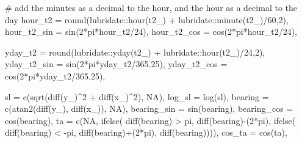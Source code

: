 \documentclass[
  letterpaper,
  DIV=11,
  numbers=noendperiod]{scrartcl}
\newenvironment{Shaded}{\begin{snugshade}}{\end{snugshade}}
\newcommand{\AttributeTok}[1]{\textcolor[rgb]{0.40,0.45,0.13}{#1}}
\newcommand{\CommentTok}[1]{\textcolor[rgb]{0.37,0.37,0.37}{#1}}
\newcommand{\ConstantTok}[1]{\textcolor[rgb]{0.56,0.35,0.01}{#1}}
\newcommand{\DecValTok}[1]{\textcolor[rgb]{0.68,0.00,0.00}{#1}}
\newcommand{\FloatTok}[1]{\textcolor[rgb]{0.68,0.00,0.00}{#1}}
\newcommand{\FunctionTok}[1]{\textcolor[rgb]{0.28,0.35,0.67}{#1}}
\newcommand{\NormalTok}[1]{\textcolor[rgb]{0.00,0.23,0.31}{#1}}
\newcommand{\SpecialCharTok}[1]{\textcolor[rgb]{0.37,0.37,0.37}{#1}}
\begin{document}
\begin{Shaded}
\begin{Highlighting}[]
    \CommentTok{\# add the minutes as a decimal to the hour, and the hour as a decimal to the day}
    \AttributeTok{hour\_t2 =} \FunctionTok{round}\NormalTok{(lubridate}\SpecialCharTok{::}\FunctionTok{hour}\NormalTok{(t2\_) }\SpecialCharTok{+}\NormalTok{ lubridate}\SpecialCharTok{::}\FunctionTok{minute}\NormalTok{(t2\_)}\SpecialCharTok{/}\DecValTok{60}\NormalTok{,}\DecValTok{2}\NormalTok{),}
    \AttributeTok{hour\_t2\_sin =} \FunctionTok{sin}\NormalTok{(}\DecValTok{2}\SpecialCharTok{*}\NormalTok{pi}\SpecialCharTok{*}\NormalTok{hour\_t2}\SpecialCharTok{/}\DecValTok{24}\NormalTok{),}
    \AttributeTok{hour\_t2\_cos =} \FunctionTok{cos}\NormalTok{(}\DecValTok{2}\SpecialCharTok{*}\NormalTok{pi}\SpecialCharTok{*}\NormalTok{hour\_t2}\SpecialCharTok{/}\DecValTok{24}\NormalTok{),}
    
    \AttributeTok{yday\_t2 =} \FunctionTok{round}\NormalTok{(lubridate}\SpecialCharTok{::}\FunctionTok{yday}\NormalTok{(t2\_) }\SpecialCharTok{+}\NormalTok{ lubridate}\SpecialCharTok{::}\FunctionTok{hour}\NormalTok{(t2\_)}\SpecialCharTok{/}\DecValTok{24}\NormalTok{,}\DecValTok{2}\NormalTok{),}
    \AttributeTok{yday\_t2\_sin =} \FunctionTok{sin}\NormalTok{(}\DecValTok{2}\SpecialCharTok{*}\NormalTok{pi}\SpecialCharTok{*}\NormalTok{yday\_t2}\SpecialCharTok{/}\FloatTok{365.25}\NormalTok{),}
    \AttributeTok{yday\_t2\_cos =} \FunctionTok{cos}\NormalTok{(}\DecValTok{2}\SpecialCharTok{*}\NormalTok{pi}\SpecialCharTok{*}\NormalTok{yday\_t2}\SpecialCharTok{/}\FloatTok{365.25}\NormalTok{),}
    
    \AttributeTok{sl =} \FunctionTok{c}\NormalTok{(}\FunctionTok{sqrt}\NormalTok{(}\FunctionTok{diff}\NormalTok{(y\_)}\SpecialCharTok{\^{}}\DecValTok{2} \SpecialCharTok{+} \FunctionTok{diff}\NormalTok{(x\_)}\SpecialCharTok{\^{}}\DecValTok{2}\NormalTok{), }\ConstantTok{NA}\NormalTok{),}
    \AttributeTok{log\_sl =} \FunctionTok{log}\NormalTok{(sl),}
    \AttributeTok{bearing =} \FunctionTok{c}\NormalTok{(}\FunctionTok{atan2}\NormalTok{(}\FunctionTok{diff}\NormalTok{(y\_), }\FunctionTok{diff}\NormalTok{(x\_)), }\ConstantTok{NA}\NormalTok{),}
    \AttributeTok{bearing\_sin =} \FunctionTok{sin}\NormalTok{(bearing),}
    \AttributeTok{bearing\_cos =} \FunctionTok{cos}\NormalTok{(bearing),}
    \AttributeTok{ta =} \FunctionTok{c}\NormalTok{(}\ConstantTok{NA}\NormalTok{, }\FunctionTok{ifelse}\NormalTok{(}
      \FunctionTok{diff}\NormalTok{(bearing) }\SpecialCharTok{\textgreater{}}\NormalTok{ pi, }\FunctionTok{diff}\NormalTok{(bearing)}\SpecialCharTok{{-}}\NormalTok{(}\DecValTok{2}\SpecialCharTok{*}\NormalTok{pi), }\FunctionTok{ifelse}\NormalTok{(}
        \FunctionTok{diff}\NormalTok{(bearing) }\SpecialCharTok{\textless{}} \SpecialCharTok{{-}}\NormalTok{pi, }\FunctionTok{diff}\NormalTok{(bearing)}\SpecialCharTok{+}\NormalTok{(}\DecValTok{2}\SpecialCharTok{*}\NormalTok{pi), }\FunctionTok{diff}\NormalTok{(bearing)))),}
    \AttributeTok{cos\_ta =} \FunctionTok{cos}\NormalTok{(ta),}
      

\end{Highlighting}
\end{Shaded}
\end{document}
